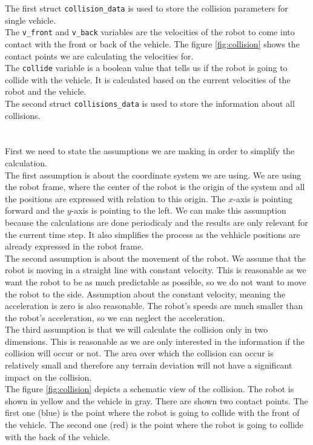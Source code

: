         The first struct \texttt{collision\_data} is used to store the collision parameters for single vehicle.\\
        The \texttt{v\_front} and \texttt{v\_back} variables are the velocities of the robot to come into contact with the front or back of the vehicle. The figure \ref{fig:collision} shows the contact points we are calculating the velocities for.\\
        The \texttt{collide} variable is a boolean value that tells us if the robot is going to collide with the vehicle. It is calculated based on the current velocities of the robot and the vehicle.\\
        The second struct \texttt{collisions\_data} is used to store the information about all collisions.\\\\
    \\
        First we need to state the assumptions we are making in order to simplify the calculation.\\
        The first assumption is about the coordinate system we are using. We are using the robot frame, where the center of the robot is the origin of the system and all the positions are expressed with relation to this origin. The $x$-axis is pointing forward and the $y$-axis is pointing to the left. We can make this assumption because the calculations are done periodicaly and the results are only relevant for the current time step. It also simplifies the process as the vehhicle positions are already expressed in the robot frame.\\
        The second assumption is about the movement of the robot. We assume that the robot is moving in a straight line with constant velocity. This is reasonable as we want the robot to be as much predictable as possible, so we do not want to move the robot to the side. Assumption about the constant velocity, meaning the acceleration is zero is also reasonable. The robot's speeds are much smaller than the robot's acceleration, so we can neglect the acceleration.\\
        The third assumption is that we will calculate the collision only in two dimensions. This is reasonable as we are only interested in the information if the collision will occur or not. The area over which the collision can occur is relatively small and therefore any terrain deviation will not have a significant impact on the collision.\\
        The figure \ref{fig:collision} depicts a schematic view of the collision. The robot is shown in yellow and the vehicle in gray. There are shown two contact points. The first one (blue) is the point where the robot is going to collide with the front of the vehicle. The second one (red) is the point where the robot is going to collide with the back of the vehicle.\\

